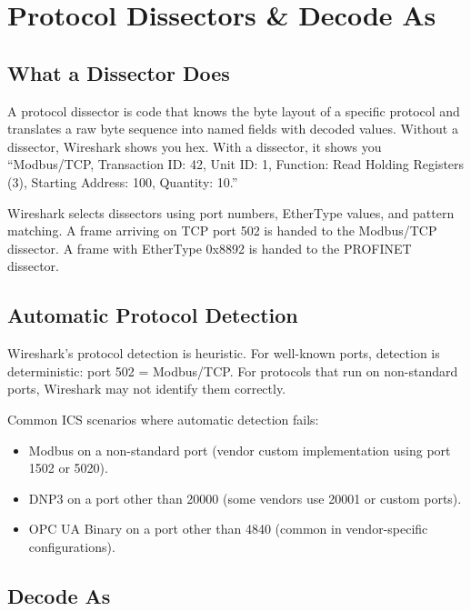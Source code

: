 \documentclass[12pt,twoside,openright]{memoir}
\begin{document}
\chapter{Protocol Dissectors \& Decode As}

\section{What a Dissector Does}

A protocol dissector is code that knows the byte layout of a specific protocol and translates a raw byte sequence into named fields with decoded values. Without a dissector, Wireshark shows you hex. With a dissector, it shows you ``Modbus/TCP, Transaction ID: 42, Unit ID: 1, Function: Read Holding Registers (3), Starting Address: 100, Quantity: 10.''

Wireshark selects dissectors using port numbers, EtherType values, and pattern matching. A frame arriving on TCP port 502 is handed to the Modbus/TCP dissector. A frame with EtherType 0x8892 is handed to the PROFINET dissector.

\section{Automatic Protocol Detection}

Wireshark's protocol detection is heuristic. For well-known ports, detection is deterministic: port 502 = Modbus/TCP. For protocols that run on non-standard ports, Wireshark may not identify them correctly.

Common ICS scenarios where automatic detection fails:
\begin{itemize}[noitemsep]
  \item Modbus on a non-standard port (vendor custom implementation using port 1502 or 5020).
  \item DNP3 on a port other than 20000 (some vendors use 20001 or custom ports).
  \item OPC UA Binary on a port other than 4840 (common in vendor-specific configurations).
\end{itemize}

\section{Decode As}
\end{document}
